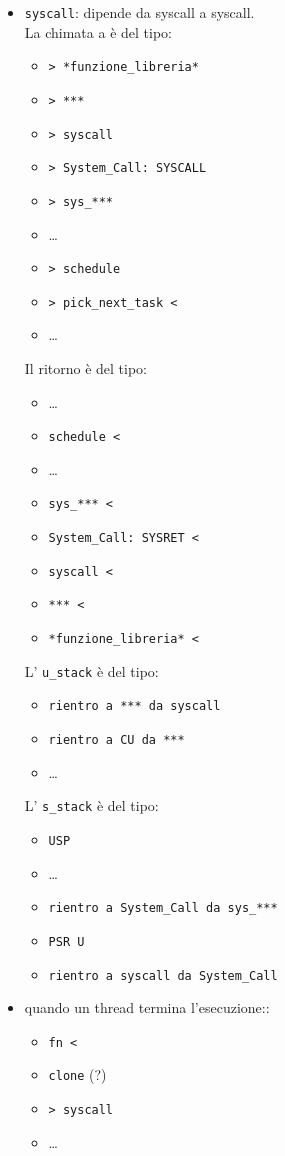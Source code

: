 \documentclass[12pt, a4paper]{report}
\begin{document}
\begin{itemize}
	\item \texttt{syscall}: dipende da syscall a syscall.\\
		La chimata a è del tipo:
		\begin{itemize}
			\item \texttt{> *funzione\_libreria*}
			\item \texttt{> ***}
			\item \texttt{> syscall}
			\item \texttt{> System\_Call: SYSCALL}
			\item \texttt{> sys\_***}
			\item \dots
			\item \texttt{> schedule}
			\item \texttt{> pick\_next\_task <}
			\item \dots
		\end{itemize}
		Il ritorno è del tipo:
		\begin{itemize}
			\item \dots
			\item \texttt{schedule <}
			\item \dots
			\item \texttt{sys\_*** <}
			\item \texttt{System\_Call: SYSRET <}
			\item \texttt{syscall <}
			\item \texttt{*** <}
			\item \texttt{*funzione\_libreria* <}
		\end{itemize}
		L' \texttt{u\_stack} è del tipo:
		\begin{itemize}
			\item \texttt{rientro a *** da syscall}
			\item \texttt{rientro a CU da ***}
			\item \dots
		\end{itemize}
		L' \texttt{s\_stack} è del tipo:
		\begin{itemize}
			\item \texttt{USP}
			\item \dots
			\item \texttt{rientro a System\_Call da sys\_***}
			\item \texttt{PSR U}
			\item \texttt{rientro a syscall da System\_Call}
		\end{itemize}
	\item quando un thread termina l'esecuzione::
		\begin{itemize}
			\item \texttt{fn <}
			\item \texttt{clone} (?) %
			\item \texttt{> syscall}
			\item \dots
		\end{itemize}
\end{itemize}
\end{document}

